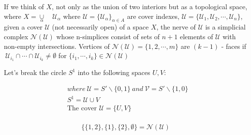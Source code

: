 \documentclass[11pt,a4paper]{report}
\begin{document}
            
             If we think of $X$, not only as the union of two interiors but as a topological space, where $X = \underset{\alpha}{\cup} \quad \mathcal{U}_\alpha$ 
             where $\mathcal{U} = \{\mathcal{U}_\alpha\}_{\alpha\in A}$ are cover indexes, $\mathcal{U} = \{\mathcal{U}_1, \mathcal{U}_2, \cdots, \mathcal{U}_n\}$, given a cover $\mathcal{U}$ (not necessarily open) of a space $X$, the nerve of $\mathcal{U}$ is a simplicial complex  $\mathcal{N}(\mathcal{U})$ whose n-simplices consist of sets of $n+1$ elements of $\mathcal{U}$ with non-empty intersections.
              Vertices of $\mathcal{N}(\mathcal{U})= \{1, 2, \cdots, m\}$ are 
              $(k - 1)$ - faces if $\ \mathcal{U}_{i_{1}} \cap \cdots \cap \mathcal{U}_{i_{k}} 
              \ne \emptyset$ for $ \{i_1, \cdots, i_k \} \in \mathcal{N}(\mathcal{U})$\\
              
              \begin{Ex} Let's break the circle $S^1$ into the following spaces $U, V$: \\
              \begin{center}
            
               \begin{align*}
                &where \ \mathcal{U} = S' \backslash \{0, 1\} \ and \  \mathcal{V} = S' \backslash \{1, 0\}\ \\
                &S^1 = \mathcal{U} \cup V\\
                &\textrm{The cover } \mathcal{U} = \{U, V\}\\
              \end{align*}

                \end{center}
              
              \[
              \{\{1, 2\}, \{1\},\{2\}, \emptyset\} = \mathcal{N}(\mathcal{U})
              \]
              \end{Ex}
\end{document}
